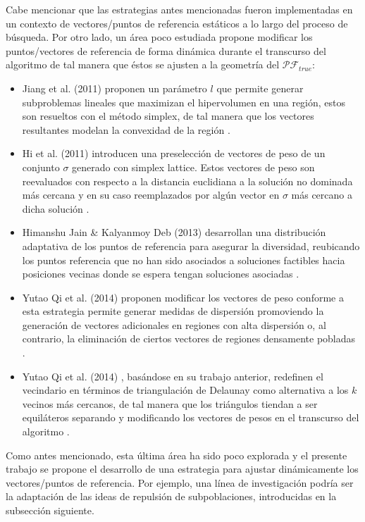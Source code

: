 \documentclass[letterpaper,10pt]{article}
\begin{document}
Cabe mencionar que las estrategias antes mencionadas fueron implementadas en un contexto de vectores/puntos de referencia estáticos a lo largo del proceso de búsqueda. Por otro lado, un área poco estudiada propone modificar los puntos/vectores de referencia de forma dinámica durante el transcurso del algoritmo de tal manera que éstos se ajusten a la geometría del $\mathcal{PF}_{true}$:
\begin{itemize}
  \item Jiang et al. (2011) proponen un parámetro $l$ que permite generar subproblemas lineales que maximizan el hipervolumen en una región, estos son resueltos con el método simplex, de tal manera que los vectores resultantes modelan la convexidad de la región \cite{jiang2011multiobjective}.
  \item Hi et al. (2011) introducen una preselección de vectores de peso de un conjunto $\sigma$  generado con simplex lattice. Estos vectores de peso son reevaluados con respecto  a la distancia euclidiana  a la solución no dominada más cercana y en su caso reemplazados por algún vector en $\sigma$ más cercano a dicha solución \cite{li2011adaptive}.
  \item Himanshu Jain \& Kalyanmoy Deb (2013) desarrollan una distribución adaptativa de los puntos de referencia para asegurar la diversidad, reubicando los puntos referencia que no han sido asociados a soluciones factibles hacia posiciones vecinas donde se espera tengan soluciones asociadas \cite{jain2013improved}.
  \item Yutao Qi et al. (2014) proponen modificar los vectores de peso conforme a esta estrategia permite generar medidas de dispersión promoviendo la generación de vectores adicionales en regiones con alta dispersión o, al contrario, la eliminación de ciertos vectores de regiones densamente pobladas \cite{doi:10.1162/EVCOa00109}.
  \item Yutao Qi et al. (2014) , basándose en su trabajo anterior, redefinen el vecindario en términos de triangulación de Delaunay como alternativa a los $k$ vecinos más cercanos, de tal manera que los triángulos tiendan a ser equiláteros separando y modificando los vectores de pesos en el transcurso del algoritmo \cite{qi2014moea}.
\end{itemize}

Como antes mencionado, esta última área ha sido poco explorada y el presente trabajo se propone el desarrollo de una estrategia para ajustar dinámicamente los vectores/puntos de referencia. Por ejemplo, una línea de investigación podría ser la adaptación de las ideas de repulsión de subpoblaciones, introducidas en la subsección siguiente.
\end{document}
